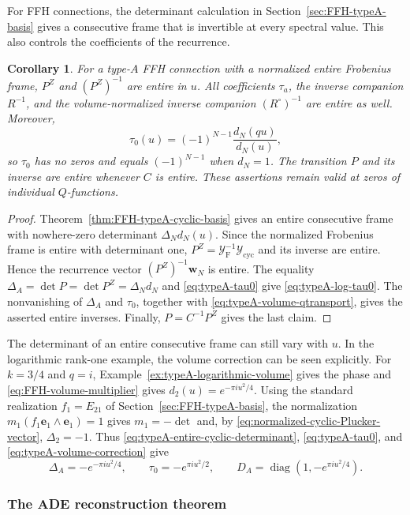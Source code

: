 \documentclass[11pt,leqno]{amsart}
\numberwithin{equation}{section}
\theoremstyle{plain}
\newtheorem{corollary}[theorem]{Corollary}
\theoremstyle{definition}
\theoremstyle{plain}
\theoremstyle{definition}
\theoremstyle{remark}
\begin{document}
For FFH connections, the determinant calculation in Section~\ref{sec:FFH-typeA-basis} gives a consecutive frame that is invertible at every spectral value. This also controls the coefficients of the recurrence.
\begin{corollary}\label{cor:FFH-typeA-entire-companion}
For a type-$A$ FFH connection with a normalized entire Frobenius frame, $P^Z$ and $(P^Z)^{-1}$ are entire in $u$. All coefficients $\tau_a$, the inverse companion $R^{-1}$, and the volume-normalized inverse companion $(R^\circ)^{-1}$ are entire as well. Moreover,
\begin{equation}\label{eq:typeA-log-tau0}
 \tau_0(u)=(-1)^{N-1}\frac{d_N(qu)}{d_N(u)},
\end{equation}
so $\tau_0$ has no zeros and equals $(-1)^{N-1}$ when $d_N=1$. The transition $P$ and its inverse are entire whenever $C$ is entire. These assertions remain valid at zeros of individual $Q$-functions.
\end{corollary}
\begin{proof}
Theorem~\ref{thm:FFH-typeA-cyclic-basis} gives an entire consecutive frame with nowhere-zero determinant $\Delta_Nd_N(u)$. Since the normalized Frobenius frame is entire with determinant one, $P^Z=\mathcal Y_{\mathrm F}^{-1}\mathcal Y_{\mathrm{cyc}}$ and its inverse are entire. Hence the recurrence vector $(P^Z)^{-1}\mathbf w_N$ is entire. The equality $\Delta_A=\det P=\det P^Z=\Delta_Nd_N$ and \eqref{eq:typeA-tau0} give \eqref{eq:typeA-log-tau0}. The nonvanishing of $\Delta_A$ and $\tau_0$, together with \eqref{eq:typeA-volume-qtransport}, gives the asserted entire inverses. Finally, $P=C^{-1}P^Z$ gives the last claim.
\end{proof}

The determinant of an entire consecutive frame can still vary with $u$. In the logarithmic rank-one example, the volume correction can be seen explicitly. For $k=3/4$ and $q=i$, Example~\ref{ex:typeA-logarithmic-volume} gives the phase and \eqref{eq:FFH-volume-multiplier} gives $d_2(u)=e^{-\pi i u^2/4}$. Using the standard realization $f_1=E_{21}$ of Section~\ref{sec:FFH-typeA-basis}, the normalization $m_1(f_1\mathbf e_1\wedge\mathbf e_1)=1$ gives $m_1=-\det$ and, by \eqref{eq:normalized-cyclic-Plucker-vector}, $\Delta_2=-1$. Thus \eqref{eq:typeA-entire-cyclic-determinant}, \eqref{eq:typeA-tau0}, and \eqref{eq:typeA-volume-correction} give
\[
 \Delta_A=-e^{-\pi i u^2/4},\qquad
 \tau_0=-e^{\pi i u^2/2},\qquad
 D_A=\operatorname{diag}(1,-e^{\pi i u^2/4}).
\]

\subsubsection{The ADE reconstruction theorem}
\end{document}
